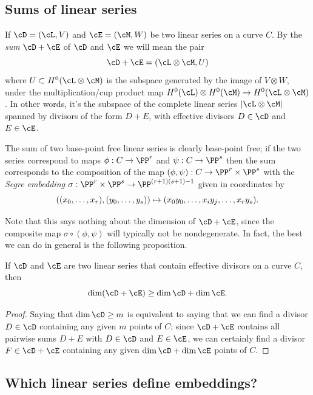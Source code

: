 \subsection*{Sums of linear series}
If
$\cD = (\cL,V)$ and $\cE = (\cM, W)$ be two linear series on a curve
$C$. By the
\emph{sum}
%
$\cD + \cE$ of $\cD$ and $\cE$
 we will mean the pair
$$
\cD + \cE = (\cL \otimes \cM, U)
$$
where $U \subset H^0(\cL \otimes \cM)$ is the subspace generated by
the image of $V \otimes W$, under the multiplication/cup product map
$H^0(\cL) \otimes H^0(\cM) \to H^0(\cL \otimes \cM)$. In other words,
it's the subspace of the complete linear series $|\cL\otimes \cM|$
spanned by divisors of the form $D+E$, with effective divisors $D \in
\cD$ and $E \in \cE$.

The sum of two base-point free linear series is clearly base-point free; if the two series correspond to maps
$\phi:C\to \PP^r$ and $\psi:C\to \PP^s$ then the sum corresponds to the composition of the map
$(\phi, \psi): C\to \PP^r\times \PP^s$ with the
\emph{Segre embedding}
%
$\sigma : \PP^r\times \PP^s \to \PP^{(r+1)(s+1)-1}$
given in coordinates by
$$
((x_0,\dots, x_r), (y_0, \dots, y_s))\mapsto (x_0y_0, \dots, x_iy_j, \dots, x_ry_s).
\vspace*{-\parskip}
$$

Note that this says nothing about the dimension of $\cD + \cE$, since the composite map $\sigma \circ (\phi, \psi)$ will typically not be nondegenerate. In fact, the best we can do in general is the following proposition.


\begin{proposition}\label{sum of linear series}
 If $\cD$ and $\cE$ are two  linear series that contain effective divisors on a curve $C$, then
$$
\dim(\cD + \cE) \geq \dim \cD + \dim \cE.
\vspace*{-\parskip}
$$
\end{proposition}

\begin{proof}
Saying that
$\dim \cD \geq m$ is equivalent to saying that we can find a divisor
$D \in \cD$ containing any given $m$ points of $C$; since $\cD + \cE$
contains all pairwise sums $D + E$ with $D \in \cD$ and $E \in \cE$,
we can certainly find a divisor $F \in \cD + \cE$ containing any given
$\dim \cD + \dim \cE$ points of $C$.
\end{proof}

\subsection*{Which linear series define embeddings?}

